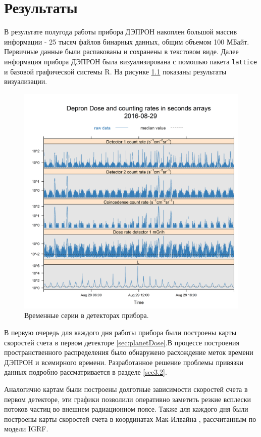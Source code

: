 
\chapter{Результаты}\label{chapt_results}
В результате полугода работы прибора ДЭПРОН накоплен большой массив информации - 25 тысяч файлов бинарных данных, общим объемом 100 МБайт. Первичные данные были распакованы и сохранены в текстовом виде.
Далее информация прибора ДЭПРОН была визуализирована с помошью пакета \texttt{lattice} и базовой графической системы R. На рисунке \ref{fig:depronseclog08-29-16} показаны результаты визуализации.
\begin{figure}[h]
	\centering
	\includegraphics[width=0.5\linewidth]{images/results/depron_sec_log08-29-16}
	\caption{Временные серии в детекторах прибора.}
	\label{fig:depronseclog08-29-16}
\end{figure}

В первую очередь для каждого дня работы прибора были построены карты скоростей счета в первом детекторе \ref{sec:planetDose}.В процессе построения пространственного распределения было обнаружено расхождение меток времени  ДЭПРОН и всемирного времени. Разработанное решение проблемы привязки данных подробно рассматривается в разделе \ref{sec3.2}.

Аналогично картам были построены долготные зависимости скоростей счета в первом детекторе, эти графики позволили оперативно заметить резкие всплески потоков частиц во внешнем радиационном поясе. Также для каждого дня были построены карты скоростей счета в координатах Мак-Илвайна \cite{McIlwain1961}, рассчитанным по модели IGRF.

